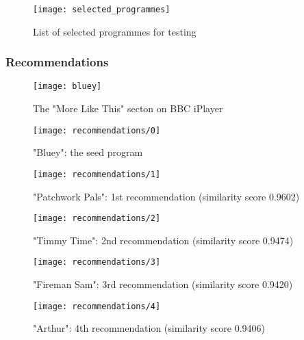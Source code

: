\begin{figure}[h]
  \centering
  \texttt{[image: selected\_programmes]}
  \caption{List of selected programmes for testing}
  \label{fig:selected_programmes}
\end{figure}

\subsubsection{Recommendations}

\begin{figure}[h]
  \centering
  \texttt{[image: bluey]}
  \caption{The "More Like This" secton on BBC iPlayer}
  \label{fig:bluey}
\end{figure}

\begin{figure}[h]
  \centering
  \texttt{[image: recommendations/0]}
  \caption{"Bluey": the seed program}
  \label{fig:recommendations:0}
\end{figure}

\begin{figure}[h]
  \centering
  \texttt{[image: recommendations/1]}
  \caption{"Patchwork Pals": 1st recommendation (similarity score 0.9602)}
  \label{fig:recommendations:1}
\end{figure}

\begin{figure}[h]
  \centering
  \texttt{[image: recommendations/2]}
  \caption{"Timmy Time": 2nd recommendation (similarity score 0.9474)}
  \label{fig:recommendations:1}
\end{figure}

\begin{figure}[h]
  \centering
  \texttt{[image: recommendations/3]}
  \caption{"Fireman Sam": 3rd recommendation (similarity score 0.9420)}
  \label{fig:recommendations:1}
\end{figure}

\begin{figure}[h]
  \centering
  \texttt{[image: recommendations/4]}
  \caption{"Arthur": 4th recommendation (similarity score 0.9406)}
  \label{fig:recommendations:1}
\end{figure}


